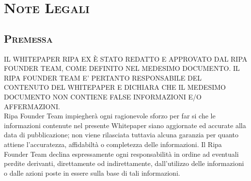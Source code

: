 

\chapter{\textsc{Note Legali}}
\begin{scriptsize}
	{\scshape
		\section{\textsc{Premessa}}
		\textsc{IL WHITEPAPER RIPA EX È STATO REDATTO E APPROVATO DAL RIPA FOUNDER TEAM, COME DEFINITO NEL MEDESIMO DOCUMENTO. 
		IL RIPA FOUNDER TEAM E’ PERTANTO RESPONSABILE DEL CONTENUTO DEL WHITEPAPER E DICHIARA CHE IL MEDESIMO DOCUMENTO NON CONTIENE 
		FALSE INFORMAZIONI E/O AFFERMAZIONI.}\\
		Ripa Founder Team  impiegherà ogni ragionevole sforzo per far si che le informazioni contenute nel presente Whitepaper 
		siano aggiornate ed accurate alla data di pubblicazione; non viene rilasciata tuttavia alcuna garanzia per quanto attiene 
		l’accuratezza, affidabiltà o completezza delle informazioni. Il Ripa Founder Team declina espressamente ogni responsabilità 
		in ordine ad eventuali perdite derivanti, direttamente od indirettamente, dall’utilizzo delle informazioni o dalle azioni 
		poste in essere sulla base di tali informazioni.
}
\end{scriptsize}
